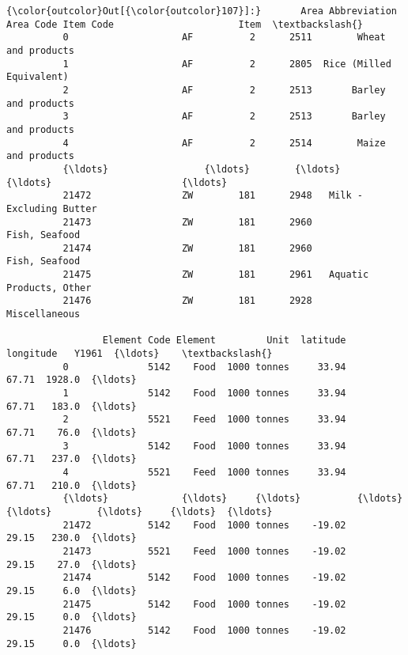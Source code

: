\documentclass[11pt]{article}
\begin{document}
\begin{Verbatim}[commandchars=\\\{\}]
{\color{outcolor}Out[{\color{outcolor}107}]:}       Area Abbreviation  Area Code Item Code                      Item  \textbackslash{}
          0                    AF          2      2511        Wheat and products   
          1                    AF          2      2805  Rice (Milled Equivalent)   
          2                    AF          2      2513       Barley and products   
          3                    AF          2      2513       Barley and products   
          4                    AF          2      2514        Maize and products   
          {\ldots}                 {\ldots}        {\ldots}       {\ldots}                       {\ldots}   
          21472                ZW        181      2948   Milk - Excluding Butter   
          21473                ZW        181      2960             Fish, Seafood   
          21474                ZW        181      2960             Fish, Seafood   
          21475                ZW        181      2961   Aquatic Products, Other   
          21476                ZW        181      2928             Miscellaneous   
          
                 Element Code Element         Unit  latitude  longitude   Y1961  {\ldots}    \textbackslash{}
          0              5142    Food  1000 tonnes     33.94      67.71  1928.0  {\ldots}     
          1              5142    Food  1000 tonnes     33.94      67.71   183.0  {\ldots}     
          2              5521    Feed  1000 tonnes     33.94      67.71    76.0  {\ldots}     
          3              5142    Food  1000 tonnes     33.94      67.71   237.0  {\ldots}     
          4              5521    Feed  1000 tonnes     33.94      67.71   210.0  {\ldots}     
          {\ldots}             {\ldots}     {\ldots}          {\ldots}       {\ldots}        {\ldots}     {\ldots}  {\ldots}     
          21472          5142    Food  1000 tonnes    -19.02      29.15   230.0  {\ldots}     
          21473          5521    Feed  1000 tonnes    -19.02      29.15    27.0  {\ldots}     
          21474          5142    Food  1000 tonnes    -19.02      29.15     6.0  {\ldots}     
          21475          5142    Food  1000 tonnes    -19.02      29.15     0.0  {\ldots}     
          21476          5142    Food  1000 tonnes    -19.02      29.15     0.0  {\ldots}     
          

\end{Verbatim}
\end{document}
